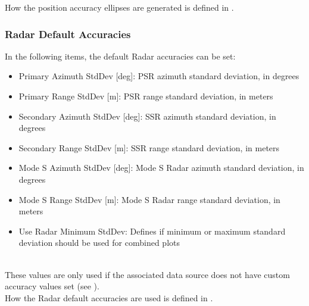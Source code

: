 How the position accuracy ellipses are generated is defined in .

\subsubsection{Radar Default Accuracies}
\label{sec:others_radar_default_accuracies}

In the following items, the default Radar accuracies can be set:

\begin{itemize}
 \item Primary Azimuth StdDev [deg]: PSR azimuth standard deviation, in degrees
 \item Primary Range StdDev [m]: PSR range standard deviation, in meters
 \item Secondary Azimuth StdDev [deg]: SSR azimuth standard deviation, in degrees
 \item Secondary Range StdDev [m]: SSR range standard deviation, in meters
 \item Mode S Azimuth StdDev [deg]: Mode S Radar azimuth standard deviation, in degrees
 \item Mode S Range StdDev [m]: Mode S Radar range standard deviation, in meters
 \item Use Radar Minimum StdDev: Defines if minimum or maximum standard deviation should be used for combined plots
\end{itemize}
\ \\

These values are only used if the associated data source does not have custom accuracy values set (see ). \\

How the Radar default accuracies are used is defined in .

